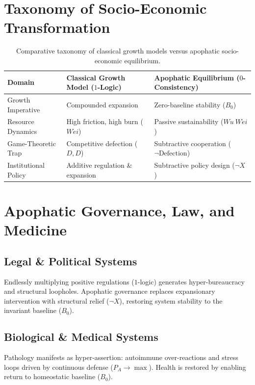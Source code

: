 \documentclass[master_monograph.tex]{subfiles}
\begin{document}
\section{Taxonomy of Socio-Economic Transformation}

\begin{table}[ht!]
\centering
\small
\renewcommand{\arraystretch}{1.3}
\begin{tabularx}{\textwidth}{@{} Y Y Y @{}}
\toprule
\textbf{Domain} & \textbf{Classical Growth Model ($1$-Logic)} & \textbf{Apophatic Equilibrium ($0$-Consistency)} \\
\midrule
Growth Imperative & Compounded expansion & Zero-baseline stability ($B_0$) \\
Resource Dynamics & High friction, high burn ($W\acute{e}i$) & Passive sustainability ($Wu\ W\acute{e}i$) \\
Game-Theoretic Trap & Competitive defection ($D, D$) & Subtractive cooperation ($\neg \text{Defection}$) \\
Institutional Policy & Additive regulation \& expansion & Subtractive policy design ($\neg X$) \\
\bottomrule
\end{tabularx}
\caption{Comparative taxonomy of classical growth models versus apophatic socio-economic equilibrium.}
\label{tab:social_taxonomy}
\end{table}

\section{Apophatic Governance, Law, and Medicine}

\subsection{Legal \& Political Systems}
Endlessly multiplying positive regulations ($1$-logic) generates hyper-bureaucracy and structural loopholes. Apophatic governance replaces expansionary intervention with structural relief ($\neg X$), restoring system stability to the invariant baseline ($B_0$).

\subsection{Biological \& Medical Systems}
Pathology manifests as hyper-assertion: autoimmune over-reactions and stress loops driven by continuous defense ($P_A \to \max$). Health is restored by enabling return to homeostatic baseline ($B_0$).
\end{document}
